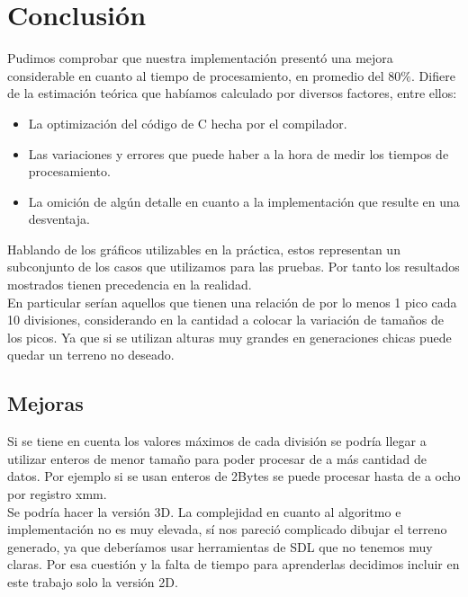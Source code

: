 \section{Conclusión}
Pudimos comprobar que nuestra implementación presentó una mejora considerable en cuanto al tiempo de procesamiento, en promedio del 80$\%$. Difiere de la estimación teórica que habíamos calculado por diversos factores, entre ellos:
\begin{itemize}
\item La optimización del código de C hecha por el compilador.
\item Las variaciones y errores que puede haber a la hora de medir los tiempos de procesamiento.
\item La omición de algún detalle en cuanto a la implementación que resulte en una desventaja.
\end{itemize}

Hablando de los gráficos utilizables en la práctica, estos representan un subconjunto de los casos que utilizamos para las pruebas. Por tanto los resultados mostrados tienen precedencia en la realidad.\\
 
En particular serían aquellos que tienen una relación de por lo menos 1 pico cada 10 divisiones, considerando en la cantidad a colocar la variación de tamaños de los picos. Ya que si se utilizan alturas muy grandes en generaciones chicas puede quedar un terreno no deseado.

\subsection{Mejoras}
Si se tiene en cuenta los valores máximos de cada división se podría llegar a utilizar enteros de menor tamaño para poder procesar de a más cantidad de datos. Por ejemplo si se usan enteros de 2Bytes se puede procesar hasta de a ocho por registro xmm.\\

Se podría hacer la versión 3D. La complejidad en cuanto al algoritmo e implementación no es muy elevada, sí nos pareció complicado dibujar el terreno generado, ya que deberíamos usar herramientas de SDL que no tenemos muy claras. Por esa cuestión y la falta de tiempo para aprenderlas decidimos incluir en este trabajo solo la versión 2D.